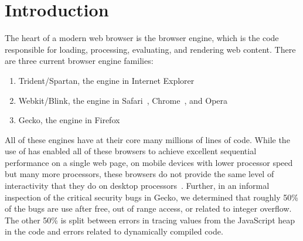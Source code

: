 \section{Introduction}
\label{sec:intro}
The heart of a modern web browser is the browser engine, which is the code responsible
for loading, processing, evaluating, and rendering web content.
There are three current browser engine families:
\begin{enumerate}
\item Trident/Spartan, the engine in Internet Explorer~\cite{IE}
\item Webkit\cite{WEBKIT}/Blink, the engine in Safari~\cite{SAFARI}, Chrome~\cite{CHROME}, and Opera~\cite{OPERA}
\item Gecko, the engine in Firefox~\cite{FIREFOX}
\end{enumerate}
All of these engines have at their core many millions of lines of \Cplusplus{} code.
While the use of \Cplusplus{} has enabled all of these browsers to achieve excellent sequential
performance on a single web page, on mobile devices with lower processor speed but many
more processors, these browsers do not provide the same level of interactivity that they
do on desktop processors~\cite{parallelizing-web-pages,ZOOMM}.
Further, in an informal inspection of the critical security bugs in Gecko, we determined that
roughly 50\% of the bugs are use after free, out of range access, or related to integer
overflow.
The other 50\% is split between errors in tracing values from the JavaScript heap in the
\Cplusplus{} code and errors related to dynamically compiled code.

